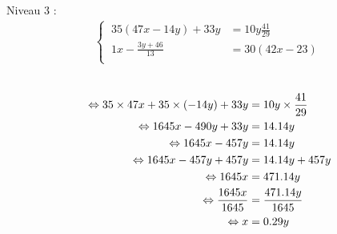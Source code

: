 \documentclass{article}%
\begin{document}
Niveau 3 :%
\begin{align*}%
\begin{cases}%
\  35(47x - 14y) + 33y &= 10y\frac{41}{29} \\%
\  1x - \frac{3y + 46}{13} &= 30(42x - 23) \\%
\end{cases}%
\\%
\end{align*}%
\ \\%
\vspace{5mm}%
\newline%
\begin{align*}%
\   \Leftrightarrow 35\times47x + 35\times(-14y) + 33y &= 10y \times \frac{41}{29} \\%
\vspace{5mm}%
\newline%
\  \Leftrightarrow 1645x - 490y + 33y &= 14.14y \\%
\vspace{5mm}%
\newline%
\  \Leftrightarrow 1645x - 457y &= 14.14y\\%
\vspace{5mm}%
\newline%
\  \Leftrightarrow 1645x - 457y + 457y &= 14.14y + 457y\\%
\vspace{5mm}%
\newline%
\  \Leftrightarrow 1645x &= 471.14y \\%
\vspace{5mm}%
\newline%
\  \Leftrightarrow \frac{1645x}{1645} &= \frac{471.14y}{1645} \\%
\vspace{5mm}%
\newline%
\  \Leftrightarrow x &= 0.29y \\%
\vspace{5mm}%
\newline%
\end{align*}%
\\%
\ \\%
\vspace{5mm}%
\newline%
\end{document}
